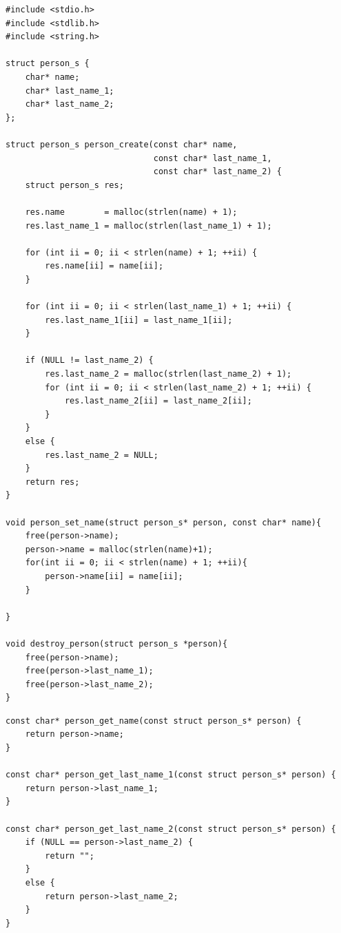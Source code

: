\documentclass[a4paper]{article}
\begin{document}
\noindent
\begin{minipage}[H]{\linewidth}
\mbox{}
\begin{lstlisting}[style=C,
caption={Struct with const pointers -- Managing functions},
label={lst:structConstPointers}]
#include <stdio.h>
#include <stdlib.h>
#include <string.h>

struct person_s {
    char* name;
    char* last_name_1;
    char* last_name_2;
};

struct person_s person_create(const char* name,
                              const char* last_name_1,
                              const char* last_name_2) {
    struct person_s res;

    res.name        = malloc(strlen(name) + 1);
    res.last_name_1 = malloc(strlen(last_name_1) + 1);

    for (int ii = 0; ii < strlen(name) + 1; ++ii) {
        res.name[ii] = name[ii];
    }

    for (int ii = 0; ii < strlen(last_name_1) + 1; ++ii) {
        res.last_name_1[ii] = last_name_1[ii];
    }

    if (NULL != last_name_2) {
        res.last_name_2 = malloc(strlen(last_name_2) + 1);
        for (int ii = 0; ii < strlen(last_name_2) + 1; ++ii) {
            res.last_name_2[ii] = last_name_2[ii];
        }
    }
    else {
        res.last_name_2 = NULL;
    }
    return res;
}

void person_set_name(struct person_s* person, const char* name){
    free(person->name);
    person->name = malloc(strlen(name)+1);
    for(int ii = 0; ii < strlen(name) + 1; ++ii){
        person->name[ii] = name[ii];
    }

}

void destroy_person(struct person_s *person){
    free(person->name);
    free(person->last_name_1);
    free(person->last_name_2);
}
\end{lstlisting}
\end{minipage}

\noindent
\begin{minipage}[H]{\linewidth}
\mbox{}
\begin{lstlisting}[style=C,
caption={Struct with const pointers -- Functions to retrieve information},
label={lst:structConstGetters}]
const char* person_get_name(const struct person_s* person) {
    return person->name;
}

const char* person_get_last_name_1(const struct person_s* person) {
    return person->last_name_1;
}

const char* person_get_last_name_2(const struct person_s* person) {
    if (NULL == person->last_name_2) {
        return "";
    }
    else {
        return person->last_name_2;
    }
}

\end{lstlisting}
\end{minipage}
\end{document}
